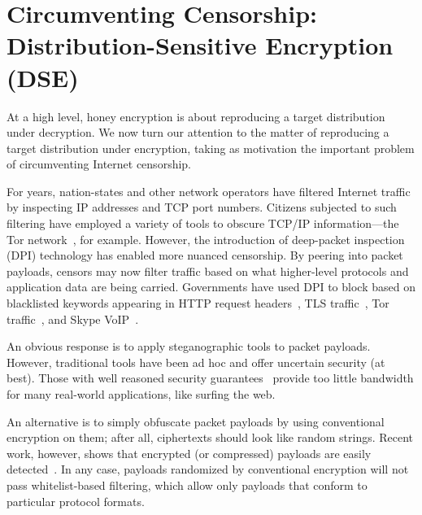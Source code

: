 

\section{Circumventing Censorship: Distribution-Sensitive Encryption (DSE)}
\label{sec:dse} 
At a high level, honey encryption is about reproducing a target distribution
under decryption.  We now turn our attention to the matter of
reproducing a target distribution under encryption, taking as motivation the
important problem of circumventing Internet censorship. 

For years, nation-states and other network operators have filtered
Internet traffic by inspecting IP addresses and TCP port numbers.
Citizens subjected to such filtering have employed a variety of tools
to obscure TCP/IP information---the Tor network~\cite{Dingledine04tor:the}, for example.  
However, the introduction of deep-packet inspection (DPI)
technology has enabled more nuanced censorship.  By peering into
packet payloads, censors may now filter traffic based on what
higher-level protocols and application data are being carried.
Governments have used DPI to block based on blacklisted keywords
appearing in HTTP request headers~\cite{ConceptDoppler}, TLS traffic~\cite{TLS:iran_block}, 
Tor traffic~\cite{Tor:iran_block-2011,Tor:iran_block,Tor:china_block_one,Tor:china_block,Tor:china_active_probe,Winter2012,Clayton06ignoringthe}, and 
Skype VoIP~\cite{China_skype_ban,UAE_skype_ban,DAC1142,Santolalla:2007,Dorfinger2010,Domingo2011}. 

An obvious response is to apply steganographic tools to packet payloads. 
However, traditional tools have been ad hoc and 
offer uncertain security (at best).  Those with well reasoned security
guarantees~\cite{Hopper:Provable_Stego} provide too little bandwidth for many real-world
applications, like surfing the web.

An alternative is to simply obfuscate packet payloads by using conventional
encryption on them; after all, ciphertexts should look like random
strings.  Recent work, however, shows that encrypted (or
compressed) payloads are easily detected~\cite{KBMP13}.
In any case, payloads randomized by conventional encryption will not pass
whitelist-based filtering, which allow only payloads that conform to
particular protocol formats.  


